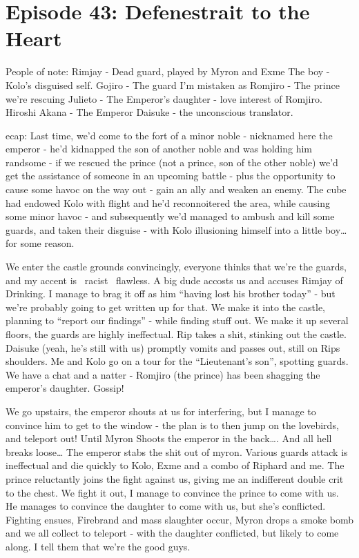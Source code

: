 \section{Episode 43: Defenestrait to the Heart}

\medskip

\noindent
People of note: Rimjay - Dead guard, played by Myron and Exme
The boy - Kolo’s disguised self.
Gojiro - The guard I’m mistaken as
Romjiro - The prince we’re rescuing
Julieto - The Emperor’s daughter - love interest of Romjiro.
Hiroshi Akana - The Emperor
Daisuke - the unconscious translator.

ecap: Last time, we’d come to the fort of a minor noble - nicknamed here the emperor - he’d kidnapped the son of another noble and was holding him randsome - if we rescued the prince (not a prince, son of the other noble) we’d get the assistance of someone in an upcoming battle - plus the opportunity to cause some havoc on the way out - gain an ally and weaken an enemy. The cube had endowed Kolo with flight and he’d reconnoitered the area, while causing some minor havoc - and subsequently we’d managed to ambush and kill some guards, and taken their disguise - with Kolo illusioning himself into a little boy… for some reason.\medskip

We enter the castle grounds convincingly, everyone thinks that we’re the guards, and my accent is ~racist~ flawless. A big dude accosts us and accuses Rimjay of Drinking. I manage to brag it off as him “having lost his brother today” - but we’re probably going to get written up for that. We make it into the castle, planning to “report our findings” - while finding stuff out. We make it up several floors, the guards are highly ineffectual. Rip takes a shit, stinking out the castle. Daisuke (yeah, he's still with us) promptly vomits and passes out, still on Rips shoulders. Me and Kolo go on a tour for the “Lieutenant’s son”, spotting guards. We have a chat and a natter - Romjiro (the prince) has been shagging the emperor’s daughter. Gossip!\medskip

We go upstairs, the emperor shouts at us for interfering, but I manage to convince him to get to the window - the plan is to then jump on the lovebirds, and teleport out! Until Myron Shoots the emperor in the back…. And all hell breaks loose… The emperor stabs the shit out of myron. Various guards attack is ineffectual and die quickly to Kolo, Exme and a combo of Riphard and me. The prince reluctantly joins the fight against us, giving me an indifferent double crit to the chest. We fight it out, I manage to convince the prince to come with us. He manages to convince the daughter to come with us, but she’s conflicted. Fighting ensues, Firebrand and mass slaughter occur, Myron drops a smoke bomb and we all collect to teleport - with the daughter conflicted, but likely to come along. I tell them that we’re the good guys.\medskip

